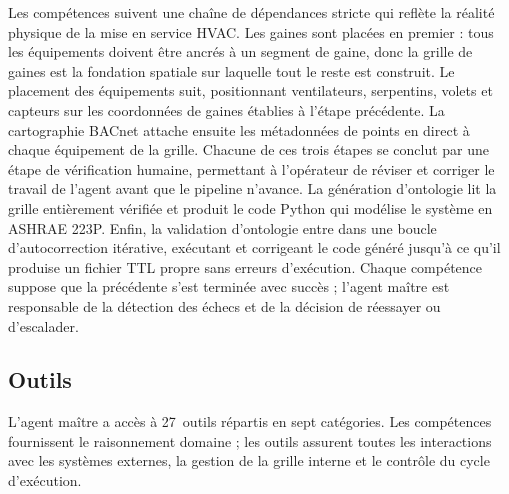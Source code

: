 Les compétences suivent une chaîne de dépendances stricte qui reflète la réalité physique de la mise
en service HVAC. Les gaines sont placées en premier : tous les équipements doivent être ancrés à un
segment de gaine, donc la grille de gaines est la fondation spatiale sur laquelle tout le reste est
construit. Le placement des équipements suit, positionnant ventilateurs, serpentins, volets et capteurs
sur les coordonnées de gaines établies à l'étape précédente. La cartographie BACnet attache ensuite
les métadonnées de points en direct à chaque équipement de la grille. Chacune de ces trois étapes se
conclut par une étape de vérification humaine, permettant à l'opérateur de réviser et corriger le
travail de l'agent avant que le pipeline n'avance. La génération d'ontologie lit la grille entièrement
vérifiée et produit le code Python qui modélise le système en ASHRAE 223P. Enfin, la validation
d'ontologie entre dans une boucle d'autocorrection itérative, exécutant et corrigeant le code généré
jusqu'à ce qu'il produise un fichier TTL propre sans erreurs d'exécution. Chaque compétence suppose
que la précédente s'est terminée avec succès ; l'agent maître est responsable de la détection des
échecs et de la décision de réessayer ou d'escalader.

\subsection{Outils}
\label{subsec:tools}

L'agent maître a accès à 27~outils répartis en sept catégories.
Les compétences fournissent le raisonnement domaine ; les outils assurent toutes les interactions avec
les systèmes externes, la gestion de la grille interne et le contrôle du cycle d'exécution.

